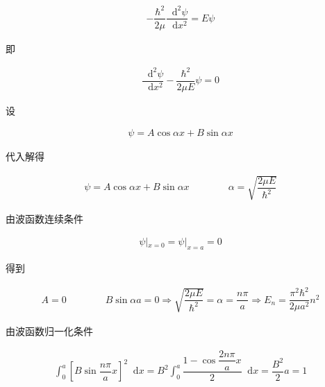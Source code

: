 \documentclass{article}
\newcommand*{\md}{\mathop{}\!\mathrm{d}}
\begin{document}
\begin{equation*}
  \begin{aligned}
    - \dfrac{\hbar^2}{2\mu} \dfrac{\md^2 \psi}{\md x^2} = E \psi  
  \end{aligned}
\end{equation*}

即

\begin{equation*}
  \begin{aligned}
    \dfrac{\md^2 \psi}{\md x^2} - \dfrac{\hbar^2}{2 \mu E} \psi = 0  
  \end{aligned}
\end{equation*}

设

\begin{equation*}
  \begin{aligned}
    \psi = A \cos \alpha x + B \sin \alpha x
  \end{aligned}
\end{equation*}

代入解得

\begin{equation*}
  \begin{aligned}
    \psi = A \cos \alpha x + B \sin \alpha x
    \quad\quad
    \quad\quad
    \alpha = \sqrt{\dfrac{2 \mu E}{\hbar^2} }
  \end{aligned}
\end{equation*}

由波函数连续条件

\begin{equation*}
  \begin{aligned}
    \psi|_{x=0} = \psi|_{x=a} = 0
  \end{aligned}
\end{equation*}

得到

\begin{equation*}
  \begin{aligned}
    A=0
    \quad\quad
    \quad\quad
    B \sin \alpha a = 0
    \Rightarrow
    \sqrt{\dfrac{2 \mu E}{\hbar^2} } = \alpha = \dfrac{n\pi}{a} 
    \Rightarrow
    E_n = \dfrac{\pi^2 \hbar^2}{2 \mu a^2} n^2 
  \end{aligned}
\end{equation*}

由波函数归一化条件

\begin{equation*}
  \begin{aligned}
    \int_0^a \left[ B \sin \dfrac{n \pi}{a} x  \right]^2 \md x
    = B^2 \int_0^a \dfrac{1 - \cos \dfrac{2n\pi}{a}x}{2} \md x
    = \dfrac{B^2}{2} a = 1 
  \end{aligned}
\end{equation*}
\end{document}
